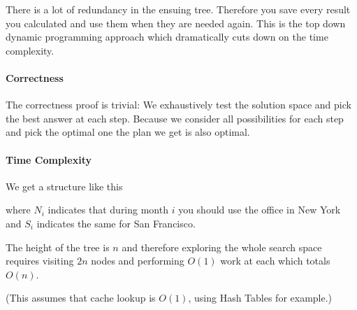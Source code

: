 \documentclass[12pt, a4paper]{article}
\begin{document}
\begin{enumerate}[(a)]
	There is a lot of redundancy in the ensuing tree. Therefore you save every result you calculated and use them when they are needed again. This is the top down dynamic programming approach which dramatically cuts down on the time complexity.

	\paragraph{Correctness}
	The correctness proof is trivial: We exhaustively test the solution space and pick the best answer at each step. Because we consider all possibilities for each step and pick the optimal one the plan we get is also optimal.

	\paragraph{Time Complexity}
	We get a structure like this


	where $N_i$ indicates that during month $i$ you should use the office in New York and $S_i$ indicates the same for San Francisco.

	The height of the tree is $n$ and therefore exploring the whole search space requires visiting $2n$ nodes and performing $O(1)$ work at each which totals $O(n)$.

	(This assumes that cache lookup is $O(1)$, using Hash Tables for example.)
\end{enumerate}
\end{document}
